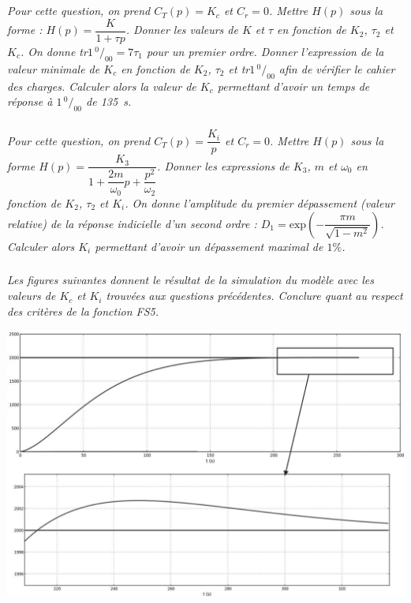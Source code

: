 \documentclass[10pt,fleqn]{article} %
\begin{document}
\begin{multicols}{2}
\subparagraph{}\textit{Pour cette question, on prend $C_T(p) = K_c$ et $C_r = 0$. Mettre $H(p)$ sous la forme :
$H(p)=\dfrac{K}{1+\tau p}$. Donner les valeurs de $K$ et $\tau$ en fonction de $K_2$, $\tau_2$ et $K_c$. On donne tr$1 \,^0\!/_{00} = 7\tau_1$ pour un
premier ordre. Donner l’expression de la valeur minimale de $K_c$ en fonction de $K_2$, $\tau_2$ et tr$1 \,^0\!/_{00}$ afin
de vérifier le cahier des charges. Calculer alors la valeur de $K_c$ permettant d’avoir un temps de réponse
à $1 \,^0\!/_{00}$ de \SI{135}{s}.}
\ifprof
\begin{corrige}
\end{corrige}
\else
\fi


\subparagraph{}\textit{Pour cette question, on prend $C_T(p)=\dfrac{K_i}{p}$ et $C_r=0$. Mettre $H(p)$ sous la forme $H(p)=\dfrac{K_3}{1+\dfrac{2m}{\omega_0}p+\dfrac{p^2}{\omega_2}}$. Donner les expressions de $K_3$, $m$ et $\omega_0$ en fonction de $K_2$, $\tau_2$ et $K_i$. On donne l'amplitude du premier dépassement (valeur relative) de la réponse indicielle d'un second ordre : $D_1 = \text{exp}\left(-\dfrac{\pi m}{\sqrt{1-m^2}} \right)$. Calculer alors $K_i$ permettant d'avoir un dépassement maximal de $1\%$.}
\ifprof
\begin{corrige}
\end{corrige}
\else
\fi


\subparagraph{}\textit{Les figures suivantes donnent le résultat de la simulation du modèle avec les
valeurs de $K_c$ et $K_i$ trouvées aux questions précédentes. Conclure quant au respect des critères de la
fonction FS5.}
\ifprof
\begin{corrige}
\end{corrige}
\else
\fi




\ifprof
\else
\end{multicols}
\fi

\begin{center}
\includegraphics[width=.8\linewidth]{images/fig_08}
\end{center}
\end{document}
